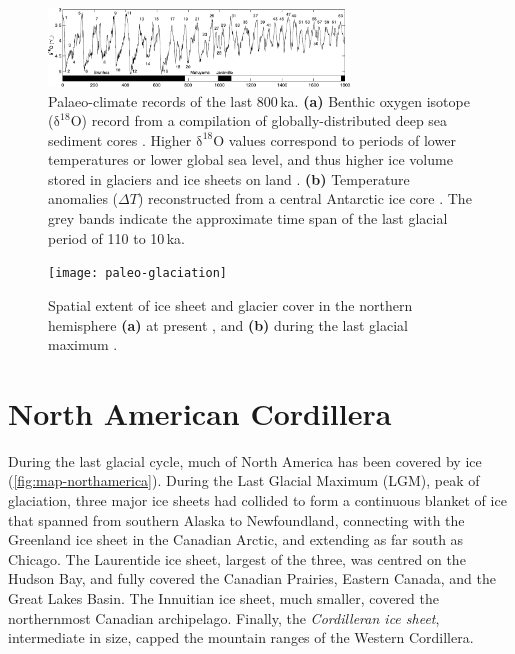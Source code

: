 \documentclass{article}
\newcommand{\chem}[1]{\ensuremath{\mathrm{#1}}}
\begin{document}
\begin{figure}
  \centering
  \includegraphics[width=80mm]{paleo-timeseries}
  \caption{Palaeo-climate records of the last 800\,ka.
           \textbf{(a)} Benthic oxygen isotope (\chem{\delta^{18}O}) record
           from a compilation of globally-distributed deep sea sediment cores
           \citep{Lisiecki.Raymo.2005}. Higher \chem{\delta^{18}O} values
           correspond to periods of lower temperatures \citep{Emiliani.1955}
           or lower global sea level, and thus higher ice volume stored in
           glaciers and ice sheets on land \citep{Shackleton.1967}.
           \textbf{(b)} Temperature anomalies ($\Delta T$) reconstructed from a
           central Antarctic ice core \citep[EPICA Dome~C,][]{Jouzel.etal.2007}.
           The grey bands indicate the approximate time span of the last
           glacial period of 110 to 10\,ka.}
  \label{fig:paleo-timeseries}
\end{figure}

\begin{figure}
  \centering
  \texttt{[image: paleo-glaciation]}
  \caption{Spatial extent of ice sheet and glacier cover in the northern
           hemisphere \textbf{(a)} at present \citep{Patterson.Kelso.2014}, and
           \textbf{(b)} during the last glacial maximum
           \citep{Ehlers.Gibbard.2007}.}
  \label{fig:paleo-glaciation}
\end{figure}

\section{North American Cordillera}

During the last glacial cycle, much of North America has been covered by ice
(\cref{fig:map-northamerica}). During the Last Glacial Maximum (LGM), peak of
glaciation, three major ice sheets had collided to
form a continuous blanket of ice that spanned from southern Alaska to
Newfoundland, connecting with the Greenland ice sheet in the Canadian Arctic,
and extending as far south as Chicago.
The Laurentide ice sheet, largest of the three, was centred on the Hudson Bay,
and fully covered the Canadian Prairies, Eastern Canada, and the Great Lakes
Basin. The Innuitian ice sheet, much smaller, covered the northernmost Canadian
archipelago. Finally, the \emph{Cordilleran ice sheet}, intermediate in size,
capped the mountain
ranges of the Western Cordillera.
\end{document}
